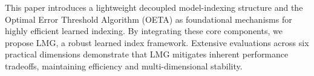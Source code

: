 
This paper introduces a lightweight decoupled model-indexing structure and the Optimal Error Threshold Algorithm (OETA) as foundational mechanisms for highly efficient learned indexing. By integrating these core components, we propose LMG, a robust learned index framework. Extensive evaluations across six practical dimensions demonstrate that LMG mitigates inherent performance tradeoffs, maintaining efficiency and multi-dimensional stability.









